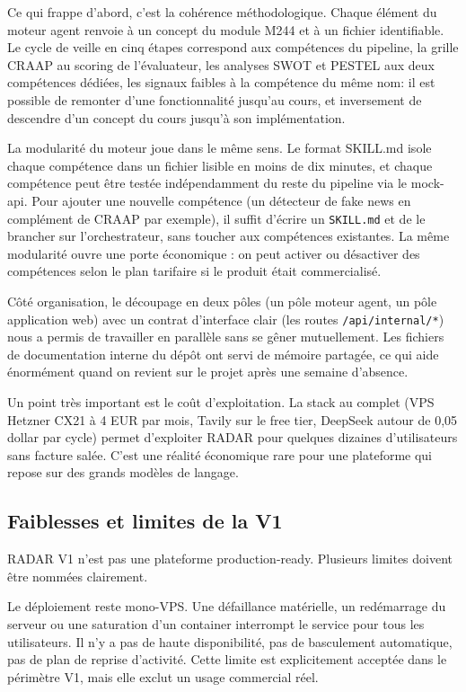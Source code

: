 \documentclass[12pt,a4paper,openany]{report}
\begin{document}
Ce qui frappe d'abord, c'est la cohérence méthodologique. Chaque élément du moteur agent renvoie à un concept du module M244 et à un fichier identifiable. Le cycle de veille en cinq étapes correspond aux compétences du pipeline, la grille CRAAP au scoring de l'évaluateur, les analyses SWOT et PESTEL aux deux compétences dédiées, les signaux faibles à la compétence du même nom: il est possible de remonter d'une fonctionnalité jusqu'au cours, et inversement de descendre d'un concept du cours jusqu'à son implémentation.

La modularité du moteur joue dans le même sens. Le format SKILL.md isole chaque compétence dans un fichier lisible en moins de dix minutes, et chaque compétence peut être testée indépendamment du reste du pipeline via le mock-api. Pour ajouter une nouvelle compétence (un détecteur de fake news en complément de CRAAP par exemple), il suffit d'écrire un \texttt{SKILL.md} et de le brancher sur l'orchestrateur, sans toucher aux compétences existantes. La même modularité ouvre une porte économique : on peut activer ou désactiver des compétences selon le plan tarifaire si le produit était commercialisé.

Côté organisation, le découpage en deux pôles (un pôle moteur agent, un pôle application web) avec un contrat d'interface clair (les routes \texttt{/api/internal/*}) nous a permis de travailler en parallèle sans se gêner mutuellement. Les fichiers de documentation interne du dépôt ont servi de mémoire partagée, ce qui aide énormément quand on revient sur le projet après une semaine d'absence.

Un point très important est le coût d'exploitation. La stack au complet (VPS Hetzner CX21 à 4 EUR par mois, Tavily sur le free tier, DeepSeek autour de 0{,}05 dollar par cycle) permet d'exploiter RADAR pour quelques dizaines d'utilisateurs sans facture salée. C'est une réalité économique rare pour une plateforme qui repose sur des grands modèles de langage.

\subsection{Faiblesses et limites de la V1}
\label{sec:faiblesses}

RADAR V1 n'est pas une plateforme production-ready. Plusieurs limites doivent être nommées clairement.

Le déploiement reste mono-VPS. Une défaillance matérielle, un redémarrage du serveur ou une saturation d'un container interrompt le service pour tous les utilisateurs. Il n'y a pas de haute disponibilité, pas de basculement automatique, pas de plan de reprise d'activité. Cette limite est explicitement acceptée dans le périmètre V1, mais elle exclut un usage commercial réel.
\end{document}
